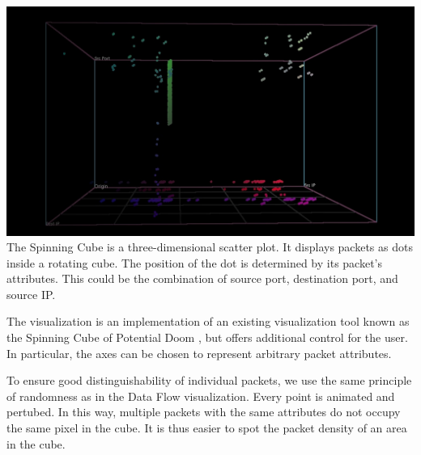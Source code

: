 \includegraphics[width=\linewidth]{materials/cube.jpg}
The Spinning Cube is a three-dimensional scatter plot. It displays packets as dots inside a rotating cube. The position of the dot is determined by its packet's attributes. This could be the combination of source port, destination port, and source IP. 

The visualization is an implementation of an existing visualization tool known as the Spinning Cube of Potential Doom \cite{lau2004spinning}, but offers additional control for the user. In particular, the axes can be chosen to represent arbitrary packet attributes.

To ensure good distinguishability of individual packets, we use the same principle of randomness as in the Data Flow visualization. Every point is animated and pertubed. In this way, multiple packets with the same attributes do not occupy the same pixel in the cube. It is thus easier to spot the packet density of an area in the cube.